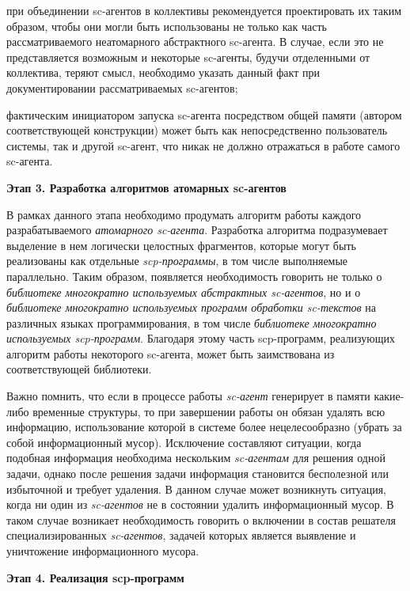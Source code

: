 \begin{textitemize}
\item при объединении sc-агентов в коллективы рекомендуется проектировать их таким образом, чтобы они могли быть использованы не только как часть рассматриваемого неатомарного абстрактного sc-агента. В случае, если это не представляется возможным и некоторые sc-агенты, будучи отделенными от коллектива, теряют смысл, необходимо указать данный факт при документировании рассматриваемых sc-агентов;
\item фактическим инициатором запуска sc-агента посредством общей памяти (автором соответствующей конструкции) может быть как непосредственно пользователь системы, так и другой sc-агент, что никак не должно отражаться в работе самого sc-агента.
\end{textitemize}

\textbf{Этап 3. Разработка алгоритмов атомарных sc-агентов}

В рамках данного этапа необходимо продумать алгоритм работы каждого разрабатываемого \textit{атомарного sc-агента}. Разработка алгоритма подразумевает выделение в нем логически целостных фрагментов, которые могут быть реализованы как отдельные \textit{scp-программы}, в том числе выполняемые параллельно. Таким образом, появляется необходимость говорить не только о \textit{библиотеке многократно используемых абстрактных sc-агентов}, но и о \textit{библиотеке многократно используемых программ обработки sc-текстов} на различных языках программирования, в том числе \textit{библиотеке многократно используемых scp-программ}. Благодаря этому часть scp-программ, реализующих алгоритм работы некоторого sc-агента, может быть заимствована из соответствующей библиотеки.

Важно помнить, что если в процессе работы \textit{sc-агент} генерирует в памяти какие-либо временные структуры, то при завершении работы он обязан удалять всю информацию, использование которой в системе более нецелесообразно (убрать за собой информационный мусор). Исключение составляют ситуации, когда подобная информация необходима нескольким \textit{sc-агентам} для решения одной задачи, однако после решения задачи информация становится бесполезной или избыточной и требует удаления. В данном случае может возникнуть ситуация, когда ни один из \textit{sc-агентов} не в состоянии удалить информационный мусор. В таком случае возникает необходимость говорить о включении в состав решателя специализированных \textit{sc-агентов}, задачей которых является выявление и уничтожение информационного мусора.

\textbf{Этап 4. Реализация scp-программ}

